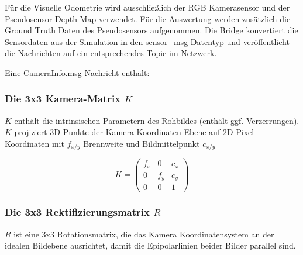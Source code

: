 Für die Visuelle Odometrie wird ausschlie{\ss}lich der RGB Kamerasensor und der Pseudosensor Depth Map verwendet. Für die Auswertung werden zusätzlich die Ground Truth Daten des Pseudosensors aufgenommen. Die Bridge konvertiert die Sensordaten aus der Simulation in den sensor\_msg Datentyp und veröffentlicht die Nachrichten auf ein entsprechendes Topic im Netzwerk.
\newline

Eine CameraInfo.msg Nachricht enthält:

\subsubsection*{Die 3x3 Kamera-Matrix $K$}
$K$ enthält die intrinsischen Parametern des Rohbildes (enthält ggf. Verzerrungen). $K$ projiziert 3D Punkte der Kamera-Koordinaten-Ebene auf 2D Pixel-Koordinaten mit $f_{x/y}$ Brennweite und Bildmittelpunkt $c_{x/y}$

\begin{displaymath}
K = 
\begin{pmatrix}
f_{x} & 0 & c_{x}\\
0 & f_{y} & c_{y}\\
0 & 0 & 1
\end{pmatrix}
\end{displaymath}

\subsubsection*{Die 3x3 Rektifizierungsmatrix $R$}
$R$ ist eine 3x3 Rotationsmatrix, die das Kamera Koordinatensystem an der idealen Bildebene ausrichtet, damit die Epipolarlinien beider Bilder parallel sind.

